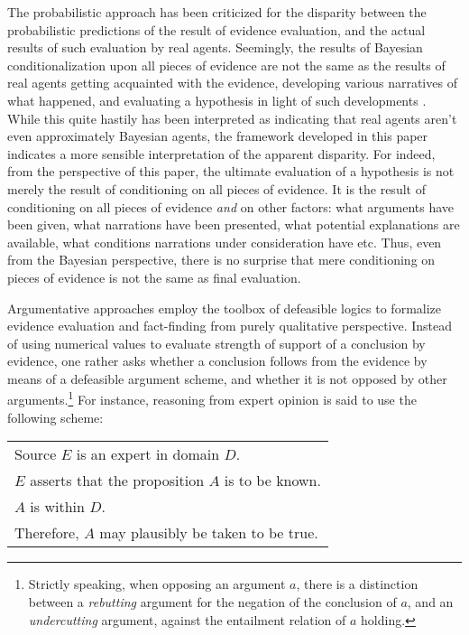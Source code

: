 \documentclass[10pt,leqno]{article}
\begin{document}
 The probabilistic approach has been criticized for the disparity between the probabilistic predictions of the result of evidence evaluation, and the actual results of such evaluation by real agents. Seemingly, the results of Bayesian conditionalization upon all pieces of evidence are not the same as the results of real agents getting acquainted with the evidence, developing various narratives of what happened, and evaluating a hypothesis in light of such developments \citep{pennington1991cognitive,pennington1992explaining}. While this quite hastily has been interpreted as indicating that real agents aren't even approximately Bayesian agents, the framework developed in this paper indicates a more sensible interpretation of the apparent disparity. For indeed, from the perspective of this paper, the ultimate evaluation of a hypothesis is not merely the result of conditioning on all pieces of evidence. It is the result of conditioning on all pieces of evidence \emph{and} on other factors: what arguments have been given, what narrations have been presented, what potential explanations are available, what conditions narrations under consideration have etc. Thus, even from the Bayesian perspective, there is no surprise that mere conditioning on pieces of evidence is not the same as final evaluation.




Argumentative approaches employ the toolbox of defeasible logics \citep{prakken1997logical,prakken2001logics} to formalize evidence evaluation and fact-finding from purely qualitative perspective. Instead of using numerical values to evaluate strength of support of a conclusion by evidence, one rather asks whether a conclusion follows from the evidence by means of a defeasible argument scheme, and whether it is not opposed by other arguments.\footnote{Strictly speaking, when opposing an argument $a$, there is a distinction between a \emph{rebutting} argument for the negation of the conclusion of $a$, and an \emph{undercutting} argument, against the entailment relation of $a$ holding.} For instance, reasoning from expert opinion is said to use the following scheme:

\vspace{-2mm}
\begin{center}
\footnotesize \begin{tabular}{p{7cm}}
Source $E$ is an expert in domain $D$.\\
$E$ asserts that the proposition $A$ is to be known.\\
$A$ is within $D$.\\
\hline 
Therefore, $A$ may plausibly be taken to be true.
\end{tabular}
\end{center}
\vspace{-2mm}
\end{document}
